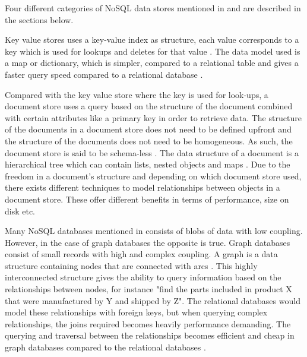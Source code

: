 
Four different categories of NoSQL data stores mentioned in \cite{Catell} and \cite{NoSQLDistilled} are described in the sections below.


Key value stores uses a key-value index as structure, each value corresponds to a key which is used for lookups and deletes for that value \cite{Catell}. The data model used is a map or dictionary, which is simpler, compared to a relational table and gives a faster query speed compared to a relational database \cite{NoSQLSurvey}.

Compared with the key value store where the key is used for look-ups, a document store uses a query based on the structure of the document combined with certain attributes like a primary key in order to retrieve data. The structure of the documents in a document store does not need to be defined upfront and the structure of the documents does not need to be homogeneous. As such, the document store is said to be schema-less \cite{NoSQLDistilled}. The data structure of a document is a hierarchical tree which can contain lists, nested objects and maps \cite{Catell, NoSQLDistilled}. Due to the freedom in a document's structure and depending on which document store used, there exists different techniques to model relationships between objects in a document store. These offer different benefits in terms of performance, size on disk etc. 

Many NoSQL databases mentioned in \cite{Catell} consists of blobs of data with low coupling. However, in the case of graph databases the opposite is true. Graph databases consist of small records with high and complex coupling. A graph is a data structure containing nodes that are connected with arcs \cite{NoSQLDistilled}. This highly interconnected structure gives the ability to query information based on the relationships between nodes, for instance "find the parts included in product X that were manufactured by Y and shipped by Z". The relational databases would model these relationships with foreign keys, but when querying complex relationships, the joins required becomes heavily performance demanding. The querying and traversal between the relationships becomes efficient and cheap in graph databases compared to the relational databases \cite{NoSQLDistilled}.

